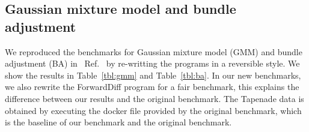 \documentclass{article}
\newcommand{\<}{\langle}
\renewcommand{\>}{\rangle}
\newcommand{\Ref}[1]{Ref.~\cite{#1}}
\newcommand{\Tbl}[1]{Table~\ref{#1}}
\newcommand{\ra}[1]{\renewcommand{\arraystretch}{#1}}
\theoremstyle{definition}\newtheorem{definition}{\textit{Definition}}
\begin{document}
\subsection{Gaussian mixture model and bundle adjustment}\label{sec:ba}

We reproduced the benchmarks for Gaussian mixture model (GMM) and bundle adjustment (BA) in ~\Ref{Srajer2018} by re-writting the programs in a reversible style. We show the results in \Tbl{tbl:gmm} and \Tbl{tbl:ba}. In our new benchmarks, we also rewrite the ForwardDiff program for a fair benchmark, this explains the difference between our results and the original benchmark. The Tapenade data is obtained by executing the docker file provided by the original benchmark, which is the baseline of our benchmark and the original benchmark.

\begin{table}[h!]\centering
    \scriptsize
\begin{minipage}{\columnwidth}
\ra{1.3}
    \caption{Absolute runtimes in seconds for computing the objective (O) and gradients (G) of GMM with 10k data points.}\label{tbl:gmm}
\end{minipage}
\end{table}
\end{document}
